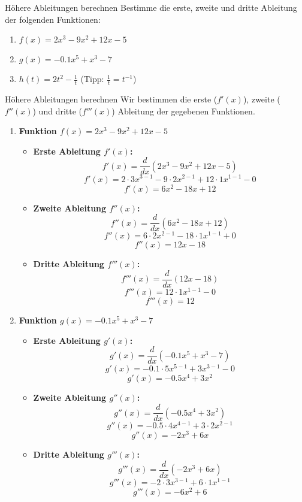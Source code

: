 \begin{aufgabenumgebung}{Höhere Ableitungen berechnen}
Bestimme die erste, zweite und dritte Ableitung der folgenden Funktionen:
\begin{enumerate}
    \item $f(x) = 2x^3 - 9x^2 + 12x - 5$
    \item $g(x) = -0.1x^5 + x^3 - 7$
    \item $h(t) = 2t^2 - \frac{1}{t}$ (Tipp: $\frac{1}{t} = t^{-1}$)
\end{enumerate}
\end{aufgabenumgebung}

\begin{loesungsumgebung}{Höhere Ableitungen berechnen}
Wir bestimmen die erste ($f'(x)$), zweite ($f''(x)$) und dritte ($f'''(x)$) Ableitung der gegebenen Funktionen.

\begin{enumerate}[label=(\alph*)]
    \item \textbf{Funktion $f(x) = 2x^3 - 9x^2 + 12x - 5$}
    \begin{itemize}
        \item \textbf{Erste Ableitung $f'(x)$:}
        $$ f'(x) = \frac{d}{dx}(2x^3 - 9x^2 + 12x - 5) $$
        $$ f'(x) = 2 \cdot 3x^{3-1} - 9 \cdot 2x^{2-1} + 12 \cdot 1x^{1-1} - 0 $$
        $$ f'(x) = 6x^2 - 18x + 12 $$
        \item \textbf{Zweite Ableitung $f''(x)$:}
        $$ f''(x) = \frac{d}{dx}(6x^2 - 18x + 12) $$
        $$ f''(x) = 6 \cdot 2x^{2-1} - 18 \cdot 1x^{1-1} + 0 $$
        $$ f''(x) = 12x - 18 $$
        \item \textbf{Dritte Ableitung $f'''(x)$:}
        $$ f'''(x) = \frac{d}{dx}(12x - 18) $$
        $$ f'''(x) = 12 \cdot 1x^{1-1} - 0 $$
        $$ f'''(x) = 12 $$
    \end{itemize}

    \item \textbf{Funktion $g(x) = -0.1x^5 + x^3 - 7$}
    \begin{itemize}
        \item \textbf{Erste Ableitung $g'(x)$:}
        $$ g'(x) = \frac{d}{dx}(-0.1x^5 + x^3 - 7) $$
        $$ g'(x) = -0.1 \cdot 5x^{5-1} + 3x^{3-1} - 0 $$
        $$ g'(x) = -0.5x^4 + 3x^2 $$
        \item \textbf{Zweite Ableitung $g''(x)$:}
        $$ g''(x) = \frac{d}{dx}(-0.5x^4 + 3x^2) $$
        $$ g''(x) = -0.5 \cdot 4x^{4-1} + 3 \cdot 2x^{2-1} $$
        $$ g''(x) = -2x^3 + 6x $$
        \item \textbf{Dritte Ableitung $g'''(x)$:}
        $$ g'''(x) = \frac{d}{dx}(-2x^3 + 6x) $$
        $$ g'''(x) = -2 \cdot 3x^{3-1} + 6 \cdot 1x^{1-1} $$
        $$ g'''(x) = -6x^2 + 6 $$
    \end{itemize}


\end{enumerate}
\end{loesungsumgebung}
